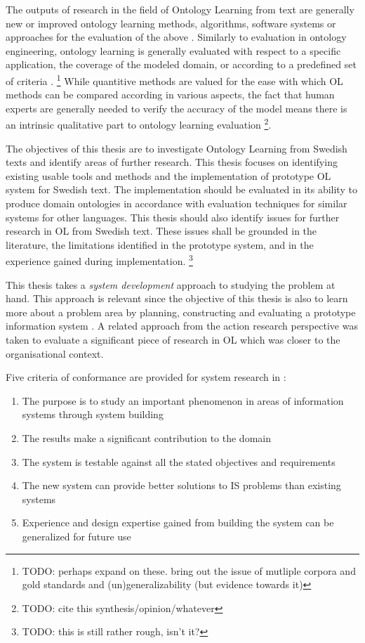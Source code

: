 \documentclass[a4paper]{report}
\newcommand{\todo}[1]{\footnote{{\color{red} TODO: #1}}}
\begin{document}
The outputs of research in the field of Ontology Learning from text are generally new or improved ontology learning methods, algorithms, software systems or approaches for the evaluation of the above \cite{Wong11Survey}.
Similarly to evaluation in ontology engineering, ontology learning is generally evaluated with respect to a specific application, the coverage of the modeled domain, or according to a predefined set of criteria \cite{Wong11Survey}.
\todo{perhaps expand on these. bring out the issue of mutliple corpora and gold standards and (un)generalizability (but evidence towards it)}
While quantitive methods are valued for the ease with which OL methods can be compared according in various aspects, the fact that human experts are generally needed to verify the accuracy of the model means there is an intrinsic qualitative part to ontology learning evaluation \todo{cite this synthesis/opinion/whatever}.

The objectives of this thesis are to investigate Ontology Learning from Swedish texts and identify areas of further research.
This thesis focuses on identifying existing usable tools and methods and the implementation of prototype OL system for Swedish text.
The implementation should be evaluated in its ability to produce domain ontologies in accordance with evaluation techniques for similar systems for other languages.
This thesis should also identify issues for further research in OL from Swedish text.
These issues shall be grounded in the literature, the limitations identified in the prototype system, and in the experience gained during implementation. \todo{this is still rather rough, isn't it?}

This thesis takes a \emph{system development} approach to studying the problem at hand.
This approach is relevant since the objective of this thesis is also to learn more about a problem area by planning, constructing and evaluating a prototype information system \cite{NunamakerChen90SDResearch}.
A related approach from the action research perspective\cite{BursteinGregor99SDResearch} was taken to evaluate a significant piece of research in OL which was closer to the organisational context\cite{Blomqvist09Thesis}.

Five criteria of conformance are provided for system research in \cite{NunamakerChen90SDResearch}:
\begin{enumerate}
\item The purpose is to study an important phenomenon in areas of information systems through
system building
\item The results make a significant contribution to the domain
\item The system is testable against all the stated objectives and requirements
\item The new system can provide better solutions to IS problems than existing systems
\item Experience and design expertise gained from building the system can be generalized for future use
\end{enumerate}
\end{document}
